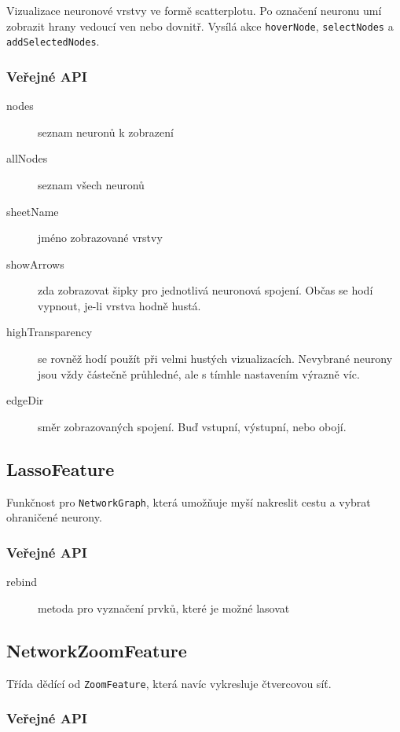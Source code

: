 Vizualizace neuronové vrstvy ve formě scatterplotu. Po označení neuronu umí zobrazit hrany vedoucí ven nebo dovnitř. Vysílá akce \lstinline|hoverNode|, \lstinline|selectNodes| a \lstinline|addSelectedNodes|.

\subsubsection*{Veřejné API}

\begin{description}
  \item[nodes] seznam neuronů k zobrazení
  \item[allNodes] seznam všech neuronů
  \item[sheetName] jméno zobrazované vrstvy
  \item[showArrows] zda zobrazovat šipky pro jednotlivá neuronová spojení. Občas se hodí vypnout, je-li vrstva hodně hustá.
  \item[highTransparency] se rovněž hodí použít při velmi hustých vizualizacích. Nevybrané neurony jsou vždy částečně průhledné, ale s tímhle nastavením výrazně víc.
  \item[edgeDir] směr zobrazovaných spojení. Buď vstupní, výstupní, nebo obojí.
\end{description}

\subsection{LassoFeature}

Funkčnost pro \lstinline|NetworkGraph|, která umožňuje myší nakreslit cestu a vybrat ohraničené neurony.

\subsubsection*{Veřejné API}

\begin{description}
  \item[rebind] metoda pro vyznačení prvků, které je možné lasovat
\end{description}

\subsection{NetworkZoomFeature}

Třída dědící od \lstinline|ZoomFeature|, která navíc vykresluje čtvercovou síť.

\subsubsection*{Veřejné API}

